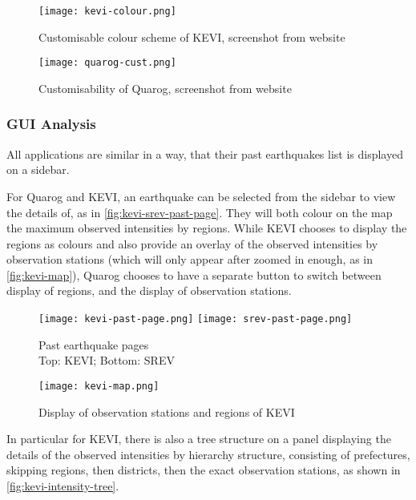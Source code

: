 \begin{figure}[htp]
    \centering

    \texttt{[image: kevi-colour.png]}
    \caption[Customisable colour scheme of KEVI]{Customisable colour scheme of KEVI, screenshot from website}
    \label{fig:kevi-colour-cust}
\end{figure}

\begin{figure}[htp]
    \centering

    \texttt{[image: quarog-cust.png]}
    \caption[Customisability of Quarog]{Customisability of Quarog, screenshot from website}
    \label{fig:quarog-cust}
\end{figure}

\subsubsection{GUI Analysis}

All applications are similar in a way, that their past earthquakes list is displayed on a sidebar.

For Quarog and KEVI, an earthquake can be selected from the sidebar to view the details of, as in \autoref{fig:kevi-srev-past-page}. They will both colour on the map the maximum observed intensities by regions. While KEVI chooses to display the regions as colours and also provide an overlay of the observed intensities by observation stations (which will only appear after zoomed in enough, as in \autoref{fig:kevi-map}), Quarog chooses to have a separate button to switch between display of regions, and the display of observation stations.

\begin{figure}[htp]
    \centering

    \texttt{[image: kevi-past-page.png]}
    \texttt{[image: srev-past-page.png]}
    \caption[Past earthquake pages for KEVI and SREV]{Past earthquake pages\\
        Top: KEVI; Bottom: SREV}
    \label{fig:kevi-srev-past-page}
\end{figure}
\begin{figure}[htp]
    \centering

    \texttt{[image: kevi-map.png]}
    \caption{Display of observation stations and regions of KEVI}
    \label{fig:kevi-map}
\end{figure}

In particular for KEVI, there is also a tree structure on a panel displaying the details of the observed intensities by hierarchy structure, consisting of prefectures, skipping regions, then districts, then the exact observation stations, as shown in \autoref{fig:kevi-intensity-tree}.

